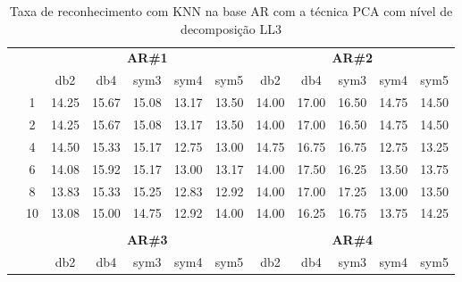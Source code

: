 \begin{table}[htpb]
	\centering
    \normalsize
	\caption{Taxa de reconhecimento com KNN na base AR com a técnica PCA com nível de decomposição LL3}
	\begin{tabular}{|c|c|c c c c c|c c c c c|}
\cline{3-12}
\multicolumn{2}{c|}{\multirow{2}{*}{}} & \multicolumn{5}{c|}{\textbf{AR\#1}}  & \multicolumn{5}{c|}{\textbf{AR\#2}} \\\cline{3-12}

\multicolumn{2}{c|}{}  & db2 & db4 & sym3 & sym4 & sym5 & db2 & db4& sym3 & sym4 & sym5 \\\hline

\multicolumn{1}{|c|}{ \multirow{5}{*}{\rotatebox[origin=c]{90}{\textbf{K-vizinhos}}} }
&1	&14.25	&15.67	&15.08	&13.17	&13.50	&14.00	&17.00	&16.50	&14.75	&14.50\\\cline{2-12}
&2	&14.25	&15.67	&15.08	&13.17	&13.50	&14.00	&17.00	&16.50	&14.75	&14.50\\\cline{2-12}
&4	&14.50	&15.33	&15.17	&12.75	&13.00	&14.75	&16.75	&16.75	&12.75	&13.25\\\cline{2-12}
&6	&14.08	&15.92	&15.17	&13.00	&13.17	&14.00	&17.50	&16.25	&13.50	&13.75\\\cline{2-12}
&8	&13.83	&15.33	&15.25	&12.83	&12.92	&14.00	&17.00	&17.25	&13.00	&13.50\\\cline{2-12}
&10	&13.08	&15.00	&14.75	&12.92	&14.00	&14.00	&16.25	&16.75	&13.75	&14.25\\ \midrule
\multicolumn{12}{c}{}\\ 




\cline{3-12}
\multicolumn{2}{c}{} & \multicolumn{5}{|c|}{\textbf{AR\#3}}  & \multicolumn{5}{c|}{\textbf{AR\#4}} \\\cline{3-12}
\multicolumn{2}{c}{}  & \multicolumn{1}{|c}{db2} & db4 & sym3 & sym4 & sym5 & db2 & db4& sym3 & sym4 & sym5 \\\hline


\end{tabular}
\end{table}
